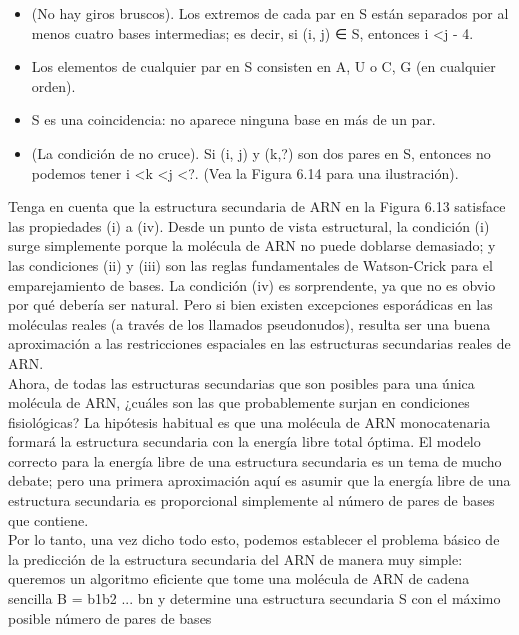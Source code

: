 \documentclass[a4paper]{article}
\begin{document}
\begin{itemize}
    \item (No hay giros bruscos). Los extremos de cada par en S están separados por al menos cuatro bases intermedias; es decir, si (i, j) ∈ S, entonces i <j - 4.
    \item Los elementos de cualquier par en S consisten en {A, U} o {C, G} (en cualquier orden).
    \item S es una coincidencia: no aparece ninguna base en más de un par.
    \item (La condición de no cruce). Si (i, j) y (k,?) son dos pares en S, entonces no podemos tener i <k <j <?. (Vea la Figura 6.14 para una ilustración).
\end{itemize}

Tenga en cuenta que la estructura secundaria de ARN en la Figura 6.13 satisface las propiedades (i) a (iv). Desde un punto de vista estructural, la condición (i) surge simplemente porque la molécula de ARN no puede doblarse demasiado; y las condiciones (ii) y (iii) son las reglas fundamentales de Watson-Crick para el emparejamiento de bases. La condición (iv) es sorprendente, ya que no es obvio por qué debería ser natural. Pero si bien existen excepciones esporádicas en las moléculas reales (a través de los llamados pseudonudos), resulta ser una buena aproximación a las restricciones espaciales en las estructuras secundarias reales de ARN.\\

Ahora, de todas las estructuras secundarias que son posibles para una única molécula de ARN, ¿cuáles son las que probablemente surjan en condiciones fisiológicas? La hipótesis habitual es que una molécula de ARN monocatenaria formará la estructura secundaria con la energía libre total óptima. El modelo correcto para la energía libre de una estructura secundaria es un tema de mucho debate; pero una primera aproximación aquí es asumir que la energía libre de una estructura secundaria es proporcional simplemente al número de pares de bases que contiene.\\

Por lo tanto, una vez dicho todo esto, podemos establecer el problema básico de la predicción de la estructura secundaria del ARN de manera muy simple: queremos un algoritmo eficiente que tome una molécula de ARN de cadena sencilla B = b1b2 ... bn y determine una estructura secundaria S con el máximo posible número de pares de bases
\end{document}
